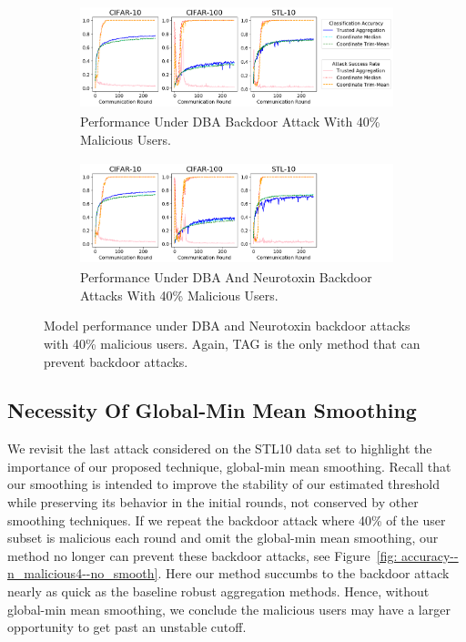 \documentclass{article} %
\begin{document}
\begin{figure}[htp]
\centering
  \begin{subfigure}{\textwidth}
  \centering
    \includegraphics[height=3cm, width=\textwidth]{make_article/make_visuals/visuals/accuracy--n_malicious4--dba1--beta0.2--d_scale.png}
    \caption{\footnotesize Performance Under DBA Backdoor Attack With 40\% Malicious Users.}
  \end{subfigure}%

  \begin{subfigure}{\textwidth}
  \centering
    \includegraphics[height=3cm, width=\textwidth]{make_article/make_visuals/visuals/accuracy--n_malicious4--dba1--beta0.2--d_scale--neuro_p0.1_nolegend.png}
    \caption{\footnotesize Performance Under DBA And Neurotoxin Backdoor Attacks With 40\% Malicious Users.}
  \end{subfigure}%
\caption{\footnotesize Model performance under DBA and Neurotoxin backdoor attacks with 40\% malicious users. Again, TAG is the only method that can prevent backdoor attacks.}
\label{fig: accuracy--n_malicious4}
\end{figure}


%
\subsection{Necessity Of Global-Min Mean Smoothing}

We revisit the last attack considered on the STL10 data set to highlight the importance of our proposed technique, global-min mean smoothing. Recall that our smoothing is intended to improve the stability of our estimated threshold while preserving its behavior in the initial rounds, not conserved by other smoothing techniques. If we repeat the backdoor attack where 40\% of the user subset is malicious each round and omit the global-min mean smoothing, our method no longer can prevent these backdoor attacks, see Figure~\ref{fig: accuracy--n_malicious4--no_smooth}. Here our method succumbs to the backdoor attack nearly as quick as the baseline robust aggregation methods. Hence, without global-min mean smoothing, we conclude the malicious users may have a larger opportunity to get past an unstable cutoff.
\end{document}
